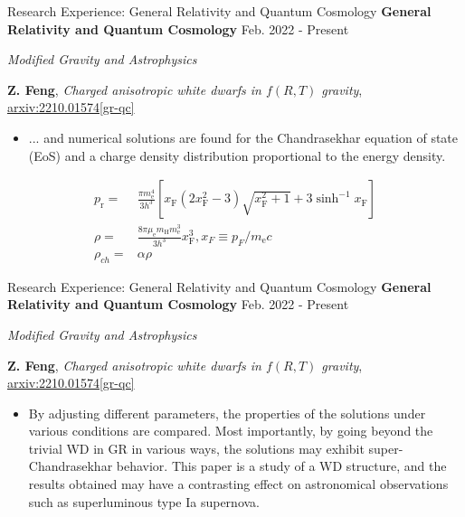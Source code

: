 \documentclass[9pt,aspectratio=169,hyperref=colorlinks]{beamer}
\begin{document}
\begin{frame}{Research Experience: General Relativity and Quantum Cosmology}
    \textbf{General Relativity and Quantum Cosmology} \hfill Feb. 2022 - Present

    \smallskip \quad \textit{Modified Gravity and Astrophysics}

    \textbf{Z. Feng}, \textit{Charged anisotropic white dwarfs in $f\left({R}, {T}\right)$ gravity}, \href{https://arxiv.org/abs/2210.01574}{arxiv:2210.01574[gr-qc]}

    \begin{itemize}
        \item ... and numerical solutions are found for the Chandrasekhar equation of state (EoS) and a charge density distribution proportional to the energy density.
    \end{itemize}

    \begin{align*}
        p_{\text{r}} = & \frac{\pi m_{\mathrm{e}}^4}{3 h^3} \left[x_{\mathrm{F}} (2 x_{\mathrm{F}}^2 - 3) \sqrt{x_{\mathrm{F}}^2 + 1} + 3 \sinh^{-1} x_{\mathrm{F}}\right] \\
        \rho =         & \frac{8 \pi \mu_{\mathrm{e}} m_{\mathrm{H}} m_{\mathrm{e}}^3}{3 h^3} x_{\mathrm{F}}^3, x_F \equiv p_F/m_\mathrm{e}c                               \\
        \rho_{ch} =    & \alpha \rho
    \end{align*}
\end{frame}

\begin{frame}{Research Experience: General Relativity and Quantum Cosmology}
    \textbf{General Relativity and Quantum Cosmology} \hfill Feb. 2022 - Present

    \smallskip \quad \textit{Modified Gravity and Astrophysics}

    \textbf{Z. Feng}, \textit{Charged anisotropic white dwarfs in $f\left({R}, {T}\right)$ gravity}, \href{https://arxiv.org/abs/2210.01574}{arxiv:2210.01574[gr-qc]}

    \begin{itemize}
        \item By adjusting different parameters, the properties of the solutions under various conditions are compared. Most importantly, by going beyond the trivial WD in GR in various ways, the solutions may exhibit super-Chandrasekhar behavior. This paper is a study of a WD structure, and the results obtained may have a contrasting effect on astronomical observations such as superluminous type Ia supernova.
    \end{itemize}
\end{frame}
\end{document}
